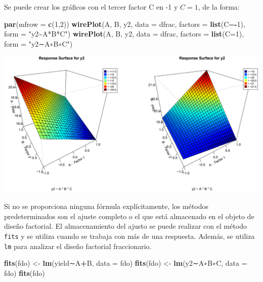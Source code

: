 \documentclass[
]{book}
\newenvironment{Shaded}{\begin{snugshade}}{\end{snugshade}}
\newcommand{\AttributeTok}[1]{\textcolor[rgb]{0.13,0.29,0.53}{#1}}
\newcommand{\DecValTok}[1]{\textcolor[rgb]{0.00,0.00,0.81}{#1}}
\newcommand{\FunctionTok}[1]{\textcolor[rgb]{0.13,0.29,0.53}{\textbf{#1}}}
\newcommand{\NormalTok}[1]{#1}
\newcommand{\OtherTok}[1]{\textcolor[rgb]{0.56,0.35,0.01}{#1}}
\newcommand{\SpecialCharTok}[1]{\textcolor[rgb]{0.81,0.36,0.00}{\textbf{#1}}}
\newcommand{\StringTok}[1]{\textcolor[rgb]{0.31,0.60,0.02}{#1}}
\begin{document}
Se puede crear los gráficos con el tercer factor C en -1 y \(C=1\), de la forma:

\begin{Shaded}
\begin{Highlighting}[]
\FunctionTok{par}\NormalTok{(}\AttributeTok{mfrow =} \FunctionTok{c}\NormalTok{(}\DecValTok{1}\NormalTok{,}\DecValTok{2}\NormalTok{))}
\FunctionTok{wirePlot}\NormalTok{(A, B, y2, }\AttributeTok{data =}\NormalTok{ dfrac, }\AttributeTok{factors =} \FunctionTok{list}\NormalTok{(}\AttributeTok{C=}\SpecialCharTok{{-}}\DecValTok{1}\NormalTok{), }\AttributeTok{form =} \StringTok{"y2\textasciitilde{}A*B*C"}\NormalTok{)}
\FunctionTok{wirePlot}\NormalTok{(A, B, y2, }\AttributeTok{data =}\NormalTok{ dfrac, }\AttributeTok{factors =} \FunctionTok{list}\NormalTok{(}\AttributeTok{C=}\DecValTok{1}\NormalTok{), }\AttributeTok{form =} \StringTok{"y2∼A∗B∗C"}\NormalTok{)}
\end{Highlighting}
\end{Shaded}

\includegraphics[width=7.29167in,height=\textheight]{graficos/multidfac2.png}

Si no se proporciona ninguna fórmula explícitamente, los métodos predeterminados son el ajuste completo o el que está almacenado en el objeto de diseño factorial. El almacenamiento del ajusto se puede realizar con el método \texttt{fits} y se utiliza cuando se trabaja con más de una respuesta. Además, se utiliza \texttt{lm} para analizar el diseño factorial fraccionario.

\begin{Shaded}
\begin{Highlighting}[]
\FunctionTok{fits}\NormalTok{(fdo) }\OtherTok{\textless{}{-}} \FunctionTok{lm}\NormalTok{(yield∼A}\SpecialCharTok{+}\NormalTok{B, }\AttributeTok{data =}\NormalTok{ fdo)}
\FunctionTok{fits}\NormalTok{(fdo) }\OtherTok{\textless{}{-}} \FunctionTok{lm}\NormalTok{(y2∼A∗B∗C, }\AttributeTok{data =}\NormalTok{ fdo)}
\FunctionTok{fits}\NormalTok{(fdo)}
\end{Highlighting}
\end{Shaded}
\end{document}
